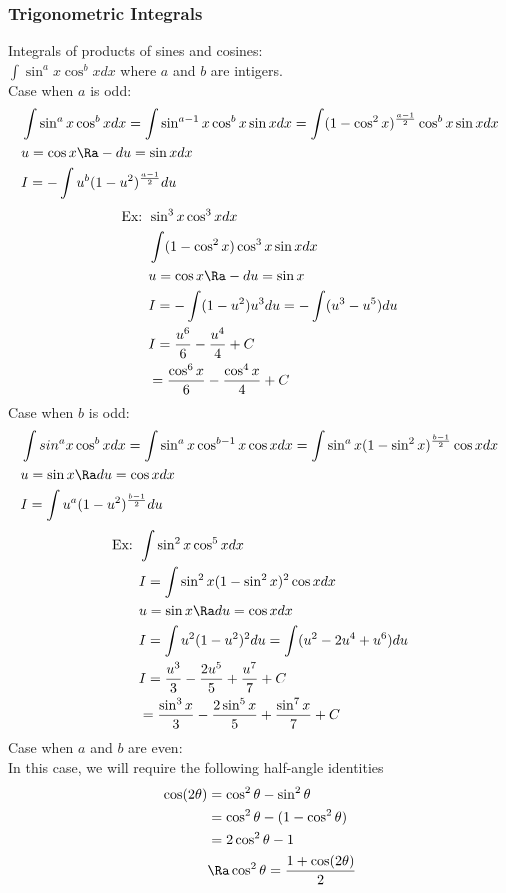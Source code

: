 \subsubsection{Trigonometric Integrals}
Integrals of products of sines and cosines:\\
$\int\sin^ax\cos^bxdx$ where $a$ and $b$ are intigers.\\
Case when $a$ is odd:
\begin{align*}
    &\int\sin^ax\cos^bxdx=\int\sin^{a-1}x\cos^bx\sin xdx=\int(1-\cos^2x)^{\frac{a-1}{2}}\cos^bx\sin xdx\\
    &u=\cos x\Ra -du=\sin xdx\\
    &I=-\int u^b(1-u^2)^{\frac{a-1}{2}}du
\end{align*}
\begin{align*}
    \text{Ex: }&\sin^3x\cos^3xdx\\
    &\int(1-\cos^2x)\cos^3x\sin xdx\\
    &u=\cos x\Ra -du=\sin x\\
    &I=-\int(1-u^2)u^3du=-\int(u^3-u^5)du\\
    &I=\frac{u^6}{6}-\frac{u^4}{4}+C\\
    &=\frac{\cos^6x}{6}-\frac{\cos^4x}{4}+C
\end{align*}
Case when $b$ is odd:
\begin{align*}
    &\int sin^ax\cos^bxdx=\int\sin^ax\cos^{b-1}x\cos xdx=\int\sin^ax(1-\sin^2 x)^{\frac{b-1}{2}}\cos xdx\\
    &u=\sin x\Ra du=\cos xdx\\
    &I=\int u^a(1-u^2)^\frac{b-1}{2}du
\end{align*}
\begin{align*}
    \text{Ex: }&\int\sin^2x\cos^5xdx\\
    &I=\int\sin^2x(1-\sin^2x)^2\cos xdx\\
    &u=\sin x\Ra du=\cos xdx\\
    &I=\int u^2(1-u^2)^2du=\int(u^2-2u^4+u^6)du\\
    &I=\frac{u^3}{3}-\frac{2u^5}{5}+\frac{u^7}{7}+C\\
    &=\frac{\sin^3 x}{3}-\frac{2\sin^5x}{5}+\frac{\sin^7x}{7}+C
\end{align*}
Case when $a$ and $b$ are even:\\
In this case, we will require the following half-angle identities
\begin{align*}
    \cos(2\theta)&=\cos^2\theta-\sin^2\theta\\
    &=\cos^2\theta-(1-\cos^2\theta)\\
    &=2\cos^2\theta-1\\
    &\Ra\cos^2\theta=\frac{1+\cos(2\theta)}{2}
\end{align*}
